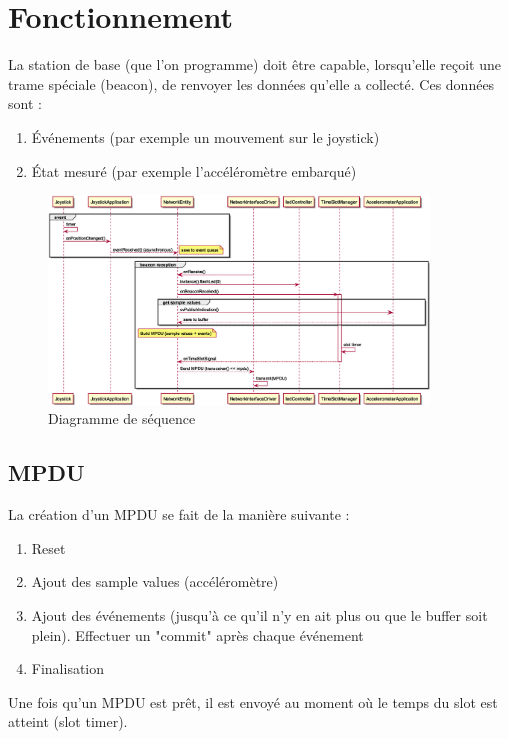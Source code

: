 \documentclass[DeseNET_Sebastien_Deriaz]{subfiles}
\begin{document}
\section{Fonctionnement}
La station de base (que l'on programme) doit être capable, lorsqu'elle reçoit une trame spéciale (beacon), de renvoyer les données qu'elle a collecté. Ces données sont :
\begin{enumerate}
\item Événements (par exemple un mouvement sur le joystick)
\item État mesuré (par exemple l'accéléromètre embarqué)
\end{enumerate}
\begin{figure}[H]
\centering
\includegraphics[width=0.9\textwidth]{out/sequence_beacon/sequence_beacon.eps}
\caption{Diagramme de séquence}
\end{figure}
\subsection{MPDU}



La création d'un MPDU se fait de la manière suivante :
\begin{enumerate}
\item Reset
\item Ajout des sample values (accéléromètre)
\item Ajout des événements (jusqu'à ce qu'il n'y en ait plus ou que le buffer soit plein). Effectuer un "commit" après chaque événement
\item Finalisation
\end{enumerate}
Une fois qu'un MPDU est prêt, il est envoyé au moment où le temps du slot est atteint (slot timer).
\end{document}
